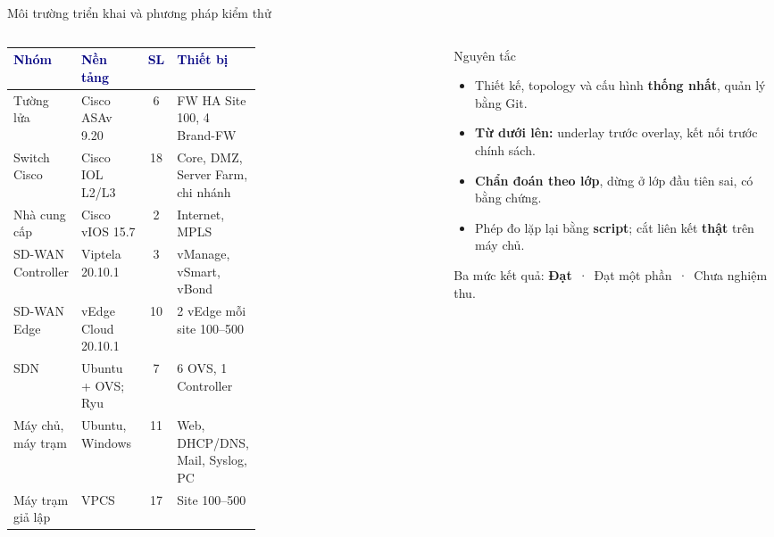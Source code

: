 \documentclass[aspectratio=169, 10pt, xcolor={table}]{beamer}
\renewcommand{\arraystretch}{1.25}
\newcommand{\hd}[1]{\textcolor{navy}{\textbf{#1}}}
\newcommand{\compactlist}{\setlength{\itemsep}{1pt}\setlength{\parskip}{0pt}}
\begin{document}
\begin{frame}{Môi trường triển khai và phương pháp kiểm thử}
    \begin{columns}[T]
        \begin{column}{0.60\textwidth}
            \scriptsize
            \renewcommand{\arraystretch}{1.08}
            \begin{tabularx}{\linewidth}{@{}L{0.25\linewidth}L{0.33\linewidth}cY@{}}
                \toprule
                \hd{Nhóm} & \hd{Nền tảng} & \hd{SL} & \hd{Thiết bị} \\
                \midrule
                Tường lửa & Cisco ASAv 9.20 & 6 & FW HA Site 100, 4 Brand-FW \\
                Switch Cisco & Cisco IOL L2/L3 & 18 & Core, DMZ, Server Farm, chi nhánh \\
                Nhà cung cấp & Cisco vIOS 15.7 & 2 & Internet, MPLS \\
                SD-WAN Controller & Viptela 20.10.1 & 3 & vManage, vSmart, vBond \\
                SD-WAN Edge & vEdge Cloud 20.10.1 & 10 & 2 vEdge mỗi site 100--500 \\
                SDN & Ubuntu + OVS; Ryu & 7 & 6 OVS, 1 Controller \\
                Máy chủ, máy trạm & Ubuntu, Windows & 11 & Web, DHCP/DNS, Mail, Syslog, PC \\
                Máy trạm giả lập & VPCS & 17 & Site 100--500 \\
                \bottomrule
            \end{tabularx}
        \end{column}
        \begin{column}{0.38\textwidth}
            \begin{card}{Nguyên tắc}
                \scriptsize
                \begin{itemize}\compactlist
                    \item Thiết kế, topology và cấu hình \textbf{thống nhất}, quản lý bằng Git.
                    \item \textbf{Từ dưới lên:} underlay trước overlay, kết nối trước chính sách.
                    \item \textbf{Chẩn đoán theo lớp}, dừng ở lớp đầu tiên sai, có bằng chứng.
                    \item Phép đo lặp lại bằng \textbf{script}; cắt liên kết \textbf{thật} trên máy chủ.
                \end{itemize}
            \end{card}
            \begin{softcard}\scriptsize
                Ba mức kết quả: \textbf{Đạt} \,·\, Đạt một phần \,·\, Chưa nghiệm thu.
            \end{softcard}
        \end{column}
    \end{columns}
\end{frame}
\end{document}

